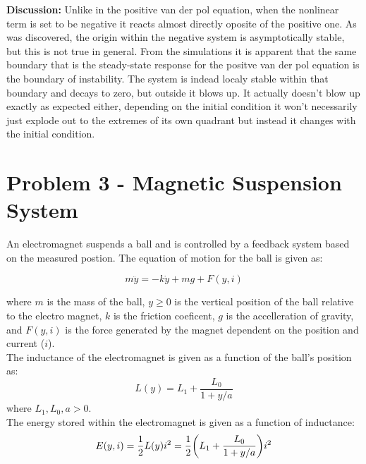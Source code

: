 \documentclass[letter]{article}
\begin{document}
\textbf{Discussion:}
Unlike in the positive van der pol equation, when the nonlinear term is set to be negative it reacts almost directly oposite of the positive one. As was discovered, the origin within the negative system is asymptotically stable, but this is not true in general. From the simulations it is apparent that the same boundary that is the steady-state response for the positve van der pol equation is the boundary of instability. The system is indead localy stable within that boundary and decays to zero, but outside it blows up. It actually doesn't blow up exactly as expected either, depending on the initial condition it won't necessarily just explode out to the extremes of its own quadrant but instead it changes with the initial condition.







\newpage
\section{Problem 3 - Magnetic  Suspension System}
	An electromagnet suspends a ball and is controlled by a feedback system based on the measured postion. The equation of motion for the ball is given as:
	
	\begin{equation} \label{eq:ball_eq}
		m \ddot{y} = -k \dot{y} + mg + F(y,i)
	\end{equation}

	where $m$ is the mass of the ball, $y \geq 0$ is the vertical position of the ball relative to the electro magnet, $k$ is the friction coeficent, $g$ is the accelleration of gravity, and $F(y,i)$ is the force generated by the magnet dependent on the position and current ($i$).\\
	
	The inductance of the electromagnet is given as a function of the ball's position as:
	\begin{equation}\label{eq:L_def}
		L(y) = L_1 + \frac{L_0}{1 + y/a}
	\end{equation}
	where $L_1, L_0, a > 0$.\\
	
	The energy stored within the electromagnet is given as a function of inductance:
	\begin{equation}\label{eq:E_def}
		E(y,i) = \frac{1}{2} L(y) i^2 = \frac{1}{2} \qty(L_1 + \frac{L_0}{1 + y/a}) i^2
	\end{equation}
	
\end{document}
